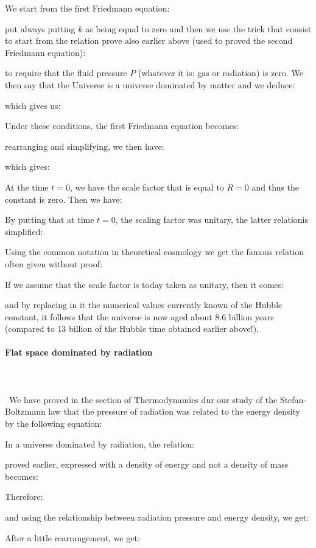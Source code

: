 	We start from the first Friedmann equation:
	
	put always putting $k$ as being equal to zero and then we use the trick that consist to start from the relation prove also earlier above (used to proved the second Friedmann equation):
	
	to require that the fluid pressure $P$ (whatever it is: gas or radiation) is zero. We then say that the Universe is a universe dominated by matter and we deduce:
	
	which gives us:
	
	Under these conditions, the first Friedmann equation becomes:
	
	rearranging and simplifying, we then have:
	
	which gives:
	
	At the time $t=0$, we have the scale factor that is equal to $R=0$ and thus the constant is zero. Then we have:
	
	By putting that at time $t=0$, the scaling factor was unitary, the latter relationis simplified:
	
	Using the common notation in theoretical cosmology we get the famous relation often given without proof:
	
	If we assume that the scale factor is today taken as unitary, then it comes:
	
	and by replacing in it the numerical values currently known of the Hubble constant, it follows that the universe is now aged about $8.6$ billion years (compared to $13$ billion of the Hubble time obtained earlier above!).
	
	\paragraph{Flat space dominated by radiation}\mbox{}\\\\\
	We have proved in the section of Thermodynamics dur our study of the Stefan-Boltzmann law that the pressure of radiation was related to the energy density by the following equation:
	
	In a universe dominated by radiation, the relation:
	
	 proved earlier, expressed with a density of energy and not a density of mass becomes:
	
	Therefore:
	
	and using the relationship between radiation pressure and energy density, we get:
	
	After a little rearrangement, we get:
	
